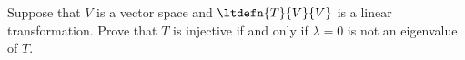 Suppose that $V$ is a vector space and $\ltdefn{T}{V}{V}$ is a linear transformation.  Prove that $T$ is injective if and only if $\lambda=0$ is not an eigenvalue of $T$.